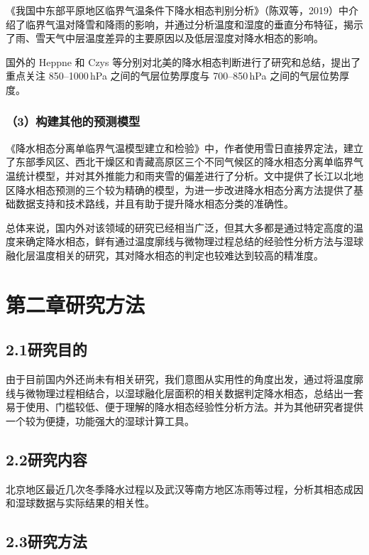 《我国中东部平原地区临界气温条件下降水相态判别分析》\cite{6}（陈双等，2019）中介绍了临界气温对降雪和降雨的影响，并通过分析温度和湿度的垂直分布特征，揭示了雨、雪天气中层温度差异的主要原因以及低层湿度对降水相态的影响。

国外的 Heppne 和 Czys 等分别对北美的降水相态判断进行了研究和总结，提出了重点关注 850--1000\,hPa 之间的气层位势厚度与 700--850\,hPa 之间的气层位势厚度。

\subsubsection*{（3）构建其他的预测模型}

《降水相态分离单临界气温模型建立和检验》\cite{7}中，作者使用雪日直接界定法，建立了东部季风区、西北干燥区和青藏高原区三个不同气候区的降水相态分离单临界气温统计模型，并对其外推能力和雨夹雪的偏差进行了分析。文中提供了长江以北地区降水相态预测的三个较为精确的模型，为进一步改进降水相态分离方法提供了基础数据支持和技术路线，并且有助于提升降水相态分类的准确性。

总体来说，国内外对该领域的研究已经相当广泛，但其大多都是通过特定高度的温度来确定降水相态，鲜有通过温度廓线与微物理过程总结的经验性分析方法与湿球融化层温度相关的研究，其对降水相态的判定也较难达到较高的精准度。

\section*{第二章\quad 研究方法}

\subsection*{2.1\quad 研究目的}

由于目前国内外还尚未有相关研究，我们意图从实用性的角度出发，通过将温度廓线与微物理过程相结合，以湿球融化层面积的相关数据判定降水相态，总结出一套易于使用、门槛较低、便于理解的降水相态经验性分析方法。并为其他研究者提供一个较为便捷，功能强大的湿球计算工具。

\subsection*{2.2\quad 研究内容}

北京地区最近几次冬季降水过程以及武汉等南方地区冻雨等过程，分析其相态成因和湿球数据与实际结果的相关性。

\subsection*{2.3\quad 研究方法}

